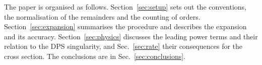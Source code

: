 The paper is organised as follows.
Section~\ref{sec:setup} sets out the conventions, the normalisation of the remainders and the counting of orders. Section~\ref{sec:expansion} summarises the procedure and describes the expansion and its accuracy. Section~\ref{sec:physics} discusses the leading power terms and their relation to the DPS singularity, and Sec.~\ref{sec:rate} their consequences for the cross section. The conclusions are in Sec.~\ref{sec:conclusions}.
